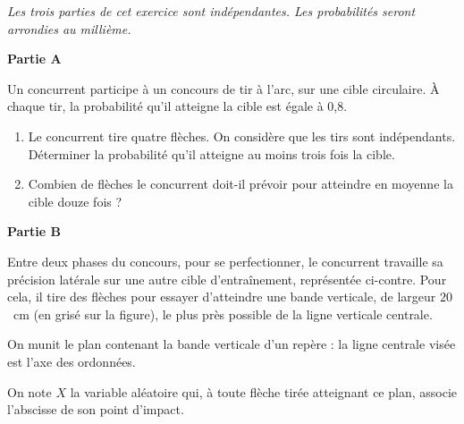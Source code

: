 \documentclass[12pt,french]{article}
\begin{document}
\begin{question}[subtitle={Asie 2015}]
\emph{Les trois parties de cet exercice sont indépendantes. Les probabilités seront arrondies au millième.}

\bigskip

\textbf{Partie A}

\medskip

Un concurrent participe à un concours de tir à l'arc, sur une cible circulaire.
À chaque tir, la probabilité qu'il atteigne la cible est égale à $0$,8.

\medskip

\begin{enumerate}
  \item Le concurrent tire quatre flèches. On considère que les tirs sont
    indépendants.
    Déterminer la probabilité qu'il atteigne au moins trois fois la cible.
  \item Combien de flèches le concurrent doit-il prévoir pour atteindre en
    moyenne la cible douze fois ?
\end{enumerate}

\bigskip

\textbf{Partie B}

\medskip

\parbox{0.65\linewidth}{Entre deux phases du concours, pour se
  perfectionner, le concurrent travaille sa précision latérale sur une autre
  cible d'entraînement, représentée ci-contre. Pour cela, il tire des
  flèches pour essayer d'atteindre une bande verticale, de largeur $20$~cm
  (en grisé sur la figure), le plus près possible de la ligne verticale
  centrale.

  On munit le plan contenant la bande verticale d'un repère : la ligne
  centrale visée est l'axe des
  ordonnées.

On note $X$ la variable aléatoire qui, à toute flèche tirée atteignant ce plan, associe l'abscisse de son point d'impact.}\hfill
\parbox{0.33\linewidth}{%
}
\medskip


\end{question}
\end{document}
